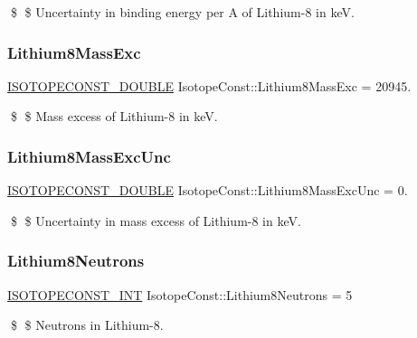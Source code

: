\$ \$ Uncertainty in binding energy per A of Lithium-\/8 in keV. \mbox{\label{group___isotope_const-_lithium-_li8_ga8ffbd3de4f8bdad35efb96b0cb7ea5e2}} 
\subsubsection{\texorpdfstring{Lithium8\+Mass\+Exc}{Lithium8MassExc}}
{\footnotesize\ttfamily \mbox{\hyperlink{group___isotope_const-_macros_ga8f45a7272ce02c0b4c65c44636ed719a}{I\+S\+O\+T\+O\+P\+E\+C\+O\+N\+S\+T\+\_\+\+D\+O\+U\+B\+LE}} Isotope\+Const\+::\+Lithium8\+Mass\+Exc = 20945.}

\$ \$ Mass excess of Lithium-\/8 in keV. \mbox{\label{group___isotope_const-_lithium-_li8_gad3ac8994a625ec7526de4b83bc2e1ea4}} 
\subsubsection{\texorpdfstring{Lithium8\+Mass\+Exc\+Unc}{Lithium8MassExcUnc}}
{\footnotesize\ttfamily \mbox{\hyperlink{group___isotope_const-_macros_ga8f45a7272ce02c0b4c65c44636ed719a}{I\+S\+O\+T\+O\+P\+E\+C\+O\+N\+S\+T\+\_\+\+D\+O\+U\+B\+LE}} Isotope\+Const\+::\+Lithium8\+Mass\+Exc\+Unc = 0.}

\$ \$ Uncertainty in mass excess of Lithium-\/8 in keV. \mbox{\label{group___isotope_const-_lithium-_li8_ga0ec95ca7ab95597f4ebeaf7b5bbfca6d}} 
\subsubsection{\texorpdfstring{Lithium8\+Neutrons}{Lithium8Neutrons}}
{\footnotesize\ttfamily \mbox{\hyperlink{group___isotope_const-_macros_ga5f18360b3e99483a35c32d789e62621c}{I\+S\+O\+T\+O\+P\+E\+C\+O\+N\+S\+T\+\_\+\+I\+NT}} Isotope\+Const\+::\+Lithium8\+Neutrons = 5}

\$ \$ Neutrons in Lithium-\/8. \mbox{\label{group___isotope_const-_lithium-_li8_ga07cc0aa750bac5785d24fce3bfd249a5}} 

